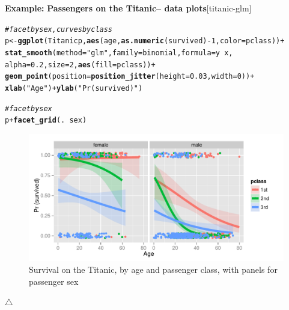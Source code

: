 \documentclass{article}
\makeatletter
\newcommand{\hlnum}[1]{\textcolor[rgb]{0.686,0.059,0.569}{#1}}%
\newcommand{\hlstr}[1]{\textcolor[rgb]{0.192,0.494,0.8}{#1}}%
\newcommand{\hlcom}[1]{\textcolor[rgb]{0.678,0.584,0.686}{\textit{#1}}}%
\newcommand{\hlopt}[1]{\textcolor[rgb]{0,0,0}{#1}}%
\newcommand{\hlstd}[1]{\textcolor[rgb]{0.345,0.345,0.345}{#1}}%
\newcommand{\hlkwb}[1]{\textcolor[rgb]{0.69,0.353,0.396}{#1}}%
\newcommand{\hlkwc}[1]{\textcolor[rgb]{0.333,0.667,0.333}{#1}}%
\newcommand{\hlkwd}[1]{\textcolor[rgb]{0.737,0.353,0.396}{\textbf{#1}}}%
\newenvironment{kframe}{%
 \def\at@end@of@kframe{}%
 \ifinner\ifhmode%
  \def\at@end@of@kframe{\end{minipage}}%
  \begin{minipage}{\columnwidth}%
 \fi\fi%
 \def\FrameCommand##1{\hskip\@totalleftmargin \hskip-\fboxsep
 \colorbox{shadecolor}{##1}\hskip-\fboxsep
     \hskip-\linewidth \hskip-\@totalleftmargin \hskip\columnwidth}%
 \MakeFramed {\advance\hsize-\width
   \@totalleftmargin\z@ \linewidth\hsize
   \@setminipage}}%
 {\par\unskip\endMakeFramed%
 \at@end@of@kframe}
\newenvironment{knitrout}{}{} %
\newenvironment{Example}[2][unnamed-example]%
  {\medskip\noindent\textbf{\textsf{Example:}}
   \textbf{#2}\hfill [#1]\par\smallskip
  }
  {\hfill $\triangle$}
\makeatother
\begin{document}
\begin{Example}[titanic-glm]{Passengers on the Titanic-- data plots}
\begin{knitrout}
\color{fgcolor}\begin{kframe}
\begin{alltt}
\hlcom{# facet by sex, curves by class}
\hlstd{p} \hlkwb{<-} \hlkwd{ggplot}\hlstd{(Titanicp,} \hlkwd{aes}\hlstd{(age,} \hlkwd{as.numeric}\hlstd{(survived)}\hlopt{-}\hlnum{1}\hlstd{,} \hlkwc{color}\hlstd{=pclass))} \hlopt{+}
  \hlkwd{stat_smooth}\hlstd{(}\hlkwc{method}\hlstd{=}\hlstr{"glm"}\hlstd{,} \hlkwc{family}\hlstd{=binomial,} \hlkwc{formula}\hlstd{=y}\hlopt{~}\hlstd{x,}
              \hlkwc{alpha}\hlstd{=}\hlnum{0.2}\hlstd{,} \hlkwc{size}\hlstd{=}\hlnum{2}\hlstd{,} \hlkwd{aes}\hlstd{(}\hlkwc{fill}\hlstd{=pclass))} \hlopt{+}
  \hlkwd{geom_point}\hlstd{(}\hlkwc{position}\hlstd{=}\hlkwd{position_jitter}\hlstd{(}\hlkwc{height}\hlstd{=}\hlnum{0.03}\hlstd{,} \hlkwc{width}\hlstd{=}\hlnum{0}\hlstd{))} \hlopt{+}
        \hlkwd{xlab}\hlstd{(}\hlstr{"Age"}\hlstd{)} \hlopt{+} \hlkwd{ylab}\hlstd{(}\hlstr{"Pr (survived)"}\hlstd{)}

\hlcom{# facet by sex}
\hlstd{p} \hlopt{+} \hlkwd{facet_grid}\hlstd{(.} \hlopt{~} \hlstd{sex)}
\end{alltt}
\end{kframe}\begin{figure}[hbt!]

{\centering \includegraphics[width=\linewidth]{figure/titanic-glm-ggp4-1} 

}

\caption[Survival on the Titanic, by age and passenger class, with panels for passenger sex]{Survival on the Titanic, by age and passenger class, with panels for passenger sex}\label{fig:titanic-glm-ggp4}
\end{figure}


\end{knitrout}


\end{Example}
\end{document}
